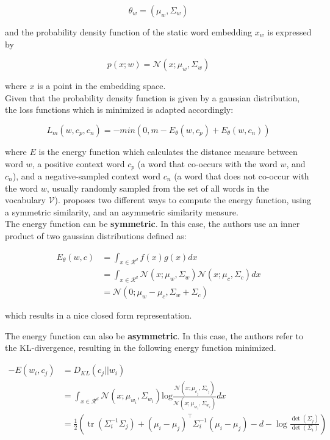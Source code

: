 \documentclass[a4paper,12pt,oneside,openright]{report}
\begin{document}
$$
\theta_w = ( \mu_w,  \Sigma_w)
$$

and the probability density function of the static word embedding $x_w$ is expressed by

\begin{equation}
p(x; w) = \mathcal{N}\left(x ; \mu_{w}, \Sigma_{w}\right)
\end{equation}

where $x$ is a point in the embedding space. \\

Given that the probability density function is given by a gaussian distribution, the loss functions which is minimized is adapted accordingly:

\begin{equation}
L_m(w, c_p, c_n) = - min(0, m - E_\theta(w, c_p) + E_\theta(w, c_n) )
\end{equation}

where $E$ is the energy function which calculates the distance measure between word $w$, a positive context word $c_p$ (a word that co-occurs with the word $w$, and $c_n$), and a negative-sampled context word $c_n$ (a word that does not co-occur with the word $w$, usually randomly sampled from the set of all words in the vocabulary $\mathcal{V}$).
\cite{vilnis14} proposes two different ways to compute the energy function, using a symmetric similarity, and an asymmetric similarity measure. \\

The energy function can be \textbf{symmetric}.
In this case, the authors use an inner product of two gaussian distributions defined as:

\begin{align}
E_\theta(w, c) &= \int_{x \in \mathcal{R}^d} f(x)g(x) dx \\
&= \int_{x \in \mathcal{R}^d} \mathcal{N}(x; \mu_w, \Sigma_w) \mathcal{N}(x; \mu_c, \Sigma_c) dx \\
&= \mathcal{N}(0; \mu_w - \mu_c, \Sigma_w + \Sigma_c)
\end{align}

which results in a nice closed form representation. 

The energy function can also be \textbf{asymmetric}.
In this case, the authors refer to the KL-divergence, resulting in the following energy function minimized.

\begin{align}
-E(w_i, c_j) & = D_{KL}(c_j || w_i) \\
&= \int_{x \in \mathcal{R}^d} \mathcal{N}(x; \mu_{w_i}, \Sigma_{w_i}) \text{log} \frac{\mathcal{N}(x; \mu_{c_j}, \Sigma_{c_j})}{\mathcal{N}(x; \mu_{w_i}, \Sigma_{w_i})} dx \\
&= \frac{1}{2}\left(\operatorname{tr}\left(\Sigma_{i}^{-1} \Sigma_{j}\right)+\left(\mu_{i}-\mu_{j}\right)^{\top} \Sigma_{i}^{-1}\left(\mu_{i}-\mu_{j}\right)-d-\log \frac{\operatorname{det}\left(\Sigma_{j}\right)}{\operatorname{det}\left(\Sigma_{i}\right)}\right)
\end{align}
\end{document}

